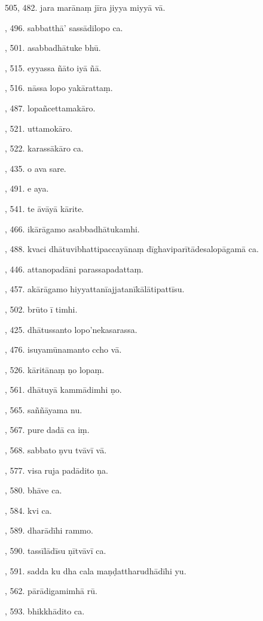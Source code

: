 505, 482. jara marānaṃ jīra jiyya miyyā vā.\par {}, 496. sabbatthā’ sassādilopo ca.\par {}, 501. asabbadhātuke bhū.\par {}, 515. eyyassa ñāto iyā ñā.\par {}, 516. nāssa lopo yakārattaṃ.\par {}, 487. lopañcettamakāro.\par {}, 521. uttamokāro.\par {}, 522. karassākāro ca.\par {}, 435. o ava sare.\par {}, 491. e aya.\par {}, 541. te āvāyā kārite.\par {}, 466. ikārāgamo asabbadhātukamhi.\par {}, 488. kvaci dhātuvibhattipaccayānaṃ dīghaviparītādesalopāgamā ca.\par {}, 446. attanopadāni parassapadattaṃ.\par {}, 457. akārāgamo hiyyattanīajjatanīkālātipattīsu.\par {}, 502. brūto ī timhi.\par {}, 425. dhātussanto lopo’nekasarassa.\par {}, 476. isuyamūnamanto ccho vā.\par {}, 526. kāritānaṃ ṇo lopaṃ.\par {}, 561. dhātuyā kammādimhi ṇo.\par {}, 565. saññāyama nu.\par {}, 567. pure dadā ca iṃ.\par {}, 568. sabbato ṇvu tvāvī vā.\par {}, 577. visa ruja padādito ṇa.\par {}, 580. bhāve ca.\par {}, 584. kvi ca.\par {}, 589. dharādīhi rammo.\par {}, 590. tassīlādīsu ṇītvāvī ca.\par {}, 591. sadda ku dha cala maṇḍattharudhādīhi yu.\par {}, 562. pārādigamimhā rū.\par {}, 593. bhikkhādito ca.\par \noindent
